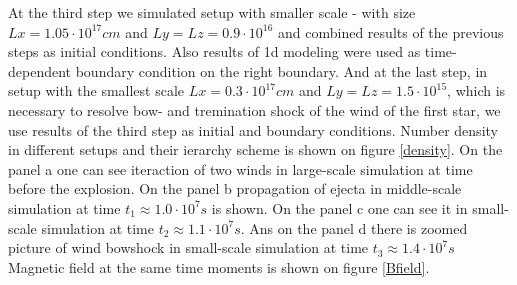 \documentclass[a4paper,12pt]{extreport}
\begin{document}
At the third step we simulated setup with smaller scale - with size $Lx = 1.05\cdot 10^{17} cm$ and $Ly = Lz = 0.9\cdot 10^{16}$ and combined results of the previous steps as initial conditions. Also results of 1d modeling were used as time-dependent boundary condition on the right boundary. And at the last step, in setup with the smallest scale $Lx = 0.3\cdot 10^{17} cm$ and $Ly = Lz = 1.5\cdot 10^{15}$, which is necessary to resolve bow- and tremination shock of the wind of the first star, we use results of the third step as initial and boundary conditions. Number density in different setups and their ierarchy scheme is shown on figure \ref{density}. On the panel a one can see iteraction of two winds in large-scale simulation at time before the explosion. On the panel b propagation of ejecta in middle-scale simulation at time $t_1 \approx 1.0\cdot10^7 s$ is shown. On the panel c one can see it in small-scale simulation at time $t_2 \approx 1.1\cdot10^7 s$. Ans on the panel d there is zoomed picture of wind bowshock in small-scale simulation at time $t_3 \approx 1.4\cdot10^7 s$ Magnetic field at the same time moments is shown on figure \ref{Bfield}.
\end{document}

